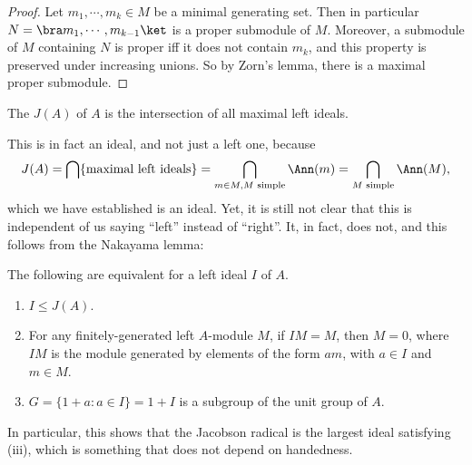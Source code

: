 \documentclass[a4paper]{article}
\begin{document}
\begin{proof}
  Let $m_1, \cdots, m_k \in M$ be a minimal generating set. Then in particular $N = \bra m_1, \cdots, m_{k - 1}\ket$ is a proper submodule of $M$. Moreover, a submodule of $M$ containing $N$ is proper iff it does not contain $m_k$, and this property is preserved under increasing unions. So by Zorn's lemma, there is a maximal proper submodule.
\end{proof}

\begin{defi}
  The  $J(A)$ of $A$ is the intersection of all maximal left ideals.
\end{defi}
This is in fact an ideal, and not just a left one, because
\[
  J(A) = \bigcap \{\text{maximal left ideals}\} = \bigcap_{m \in M, M\text{ simple}} \Ann(m) = \bigcap_{M\text{ simple}} \Ann(M),
\]
which we have established is an ideal. Yet, it is still not clear that this is independent of us saying ``left'' instead of ``right''. It, in fact, does not, and this follows from the Nakayama lemma:

\begin{lemma}
  The following are equivalent for a left ideal $I$ of $A$.
  \begin{enumerate}
    \item $I \leq J(A)$.
    \item For any finitely-generated left $A$-module $M$, if $IM = M$, then $M = 0$, where $IM$ is the module generated by elements of the form $am$, with $a \in I$ and $m \in M$.
    \item $G = \{1 + a: a \in I\} = 1 + I$ is a subgroup of the unit group of $A$.
  \end{enumerate}
\end{lemma}
In particular, this shows that the Jacobson radical is the largest ideal satisfying (iii), which is something that does not depend on handedness.
\end{document}
